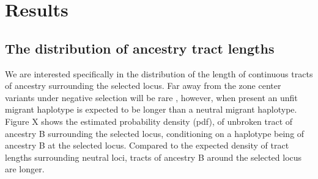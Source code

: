 \documentclass[12pt]{article}
\begin{document}

\section{Results}
\subsection*{The distribution of ancestry tract lengths}
We are interested specifically in the distribution of the length of continuous tracts of ancestry surrounding the selected locus. Far away from the zone center variants under negative selection will be rare \citep[for demonstration of this theoretical result, see e.g.][]{May1975,Slatkin1973,Barton??}, however, when present an unfit migrant haplotype is expected to be longer than a neutral migrant haplotype. Figure X shows the estimated probability density (pdf), of unbroken tract of ancestry B surrounding the selected locus, conditioning on a haplotype being of ancestry B at the selected locus. Compared to the expected density of tract lengths surrounding neutral loci, tracts of ancestry B around the selected locus are longer.
\end{document}

